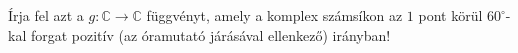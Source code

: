 \documentclass[11pt]{scrartcl}
\begin{document}
Írja fel azt a $g : \mathbb{C} \to \mathbb{C}$ függvényt, amely a komplex
számsíkon az $1$ pont körül $60^\circ$-kal forgat pozitív (az óramutató
járásával ellenkező) irányban!
\end{document}
